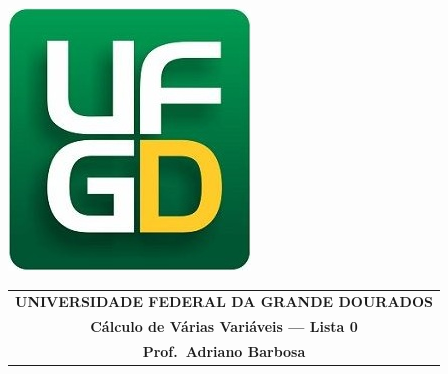 \documentclass[a4paper,5pt]{amsbook}
\begin{document}
\thispagestyle{empty}
\pagestyle{empty}
\begin{minipage}[h]{0.14\textwidth}
	\includegraphics[scale=0.24]{../../ufgd.png}
\end{minipage}
\begin{minipage}[h]{\textwidth}
\begin{tabular}{c}
{{\bf UNIVERSIDADE FEDERAL DA GRANDE DOURADOS}}\\
{{\bf C\'alculo de V\'arias Vari\'aveis --- Lista 0}}\\
{{\bf Prof.\ Adriano Barbosa}}\\
\end{tabular}
\vspace{-0.45cm}
%
\end{minipage}

\end{document}
